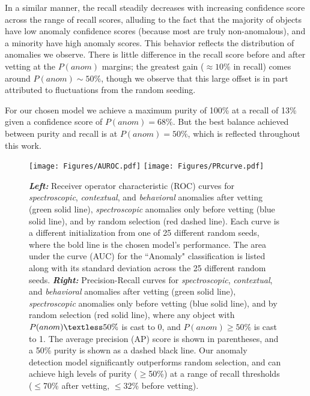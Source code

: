 \documentclass[twocolumn]{aastex63}
\begin{document}
In a similar manner, the recall steadily decreases with increasing confidence score across the range of recall scores, alluding to the fact that the majority of objects have low anomaly confidence scores (because most are truly non-anomalous), and a minority have high anomaly scores. This behavior reflects the distribution of anomalies we observe. There is little difference in the recall score before and after vetting at the $P(anom)$ margins; the greatest gain ($\approx10\%$ in recall) comes around $P(anom)\sim50\%$, though we observe that this large offset is in part attributed to fluctuations from the random seeding. \par

For our chosen model we achieve a maximum purity of 100\% at a recall of 13\% given a confidence score of $P(anom)=68\%$. But the best balance achieved between purity and recall is at $P(anom)=50\%$, which is reflected throughout this work. \par

\begin{figure}
    \centering
    \texttt{[image: Figures/AUROC.pdf]}
    \texttt{[image: Figures/PRcurve.pdf]}
    \caption{
    \textbf{\textit{Left:}} Receiver operator characteristic (ROC) curves for \emph{spectroscopic}, \emph{contextual}, and \emph{behavioral} anomalies after vetting (green solid line), \emph{spectroscopic} anomalies only before vetting (blue solid line), and by random selection (red dashed line). Each curve is a different initialization from one of 25 different random seeds, where the bold line is the chosen model's performance. The area under the curve (AUC) for the ``Anomaly" classification is listed along with its standard deviation across the 25 different random seeds. 
    \textbf{\textit{Right:}}
    Precision-Recall curves for \emph{spectroscopic}, \emph{contextual}, and \emph{behavioral} anomalies after vetting (green solid line), \emph{spectroscopic} anomalies only before vetting (blue solid line), and by random selection (red solid line), where any object with $P(anom)\textless50\%$ is cast to 0, and $P(anom)\geq50\%$ is cast to 1. The average precision (AP) score is shown in parentheses, and a 50\% purity is shown as a dashed black line. Our anomaly detection model significantly outperforms random selection, and can achieve high levels of purity ($\geq$50\%) at a range of recall thresholds ($\leq$70\% after vetting, $\leq$32\% before vetting).
    } 
    \label{fig:AUROC_PRcurves}
\end{figure}
\end{document}
